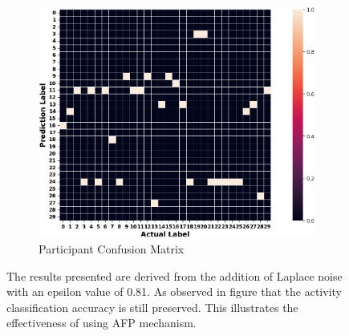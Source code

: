 \documentclass{l4proj}
\begin{document}
\begin{appendices}
\begin{figure}[h]
\begin{subfigure}{0.45\textwidth}
        \includegraphics[width=\textwidth]{images/privacy-preservation-method2-participant-confusion-matrix.png}
        \caption{Participant Confusion Matrix}
        \label{fig:privacy-preservation-method2-participant-confusion-matrix}
    \end{subfigure}
    \caption{The results presented are derived from the addition of Laplace noise with an epsilon value of 0.81. As observed in figure  that the activity classification accuracy is still preserved. This illustrates the effectiveness of using AFP mechanism.}
    \label{fig:privacy-preservation-method2-result-evaluation}
\end{figure}

\newpage


\end{appendices}
\end{document}
